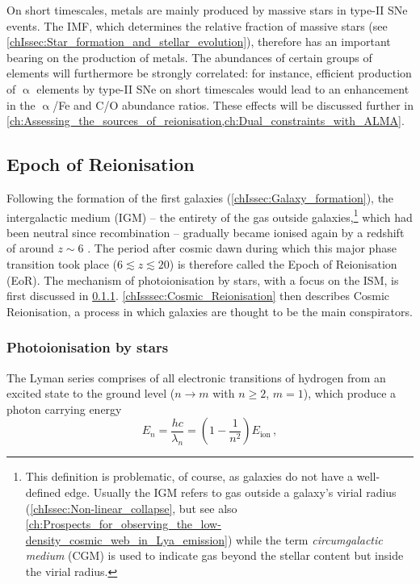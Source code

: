 On short timescales, metals are mainly produced by massive stars in type-II SNe events. The IMF, which determines the relative fraction of massive stars (see \cref{chIssec:Star_formation_and_stellar_evolution}), therefore has an important bearing on the production of metals. The abundances of certain groups of elements will furthermore be strongly correlated: for instance, efficient production of $\upalpha$ elements by type-II SNe on short timescales would lead to an enhancement in the $\upalpha$/Fe and C/O abundance ratios. These effects will be discussed further in \cref{ch:Assessing_the_sources_of_reionisation,ch:Dual_constraints_with_ALMA}.

\subsection{Epoch of Reionisation}
\label{chIssec:Epoch_of_Reionisation}

Following the formation of the first galaxies (\cref{chIssec:Galaxy_formation}), the intergalactic medium (IGM) -- the entirety of the gas outside galaxies,\footnote{This definition is problematic, of course, as galaxies do not have a well-defined edge. Usually the IGM refers to gas outside a galaxy's virial radius (\cref{chIssec:Non-linear_collapse}, but see also \cref{ch:Prospects_for_observing_the_low-density_cosmic_web_in_Lya_emission}) while the term \textit{circumgalactic medium} (CGM) is used to indicate gas beyond the stellar content but inside the virial radius.} which had been neutral since recombination -- gradually became ionised again by a redshift of around $z \sim 6$ \citep{2021arXiv211013160R}. The period after cosmic dawn during which this major phase transition took place ($6 \lesssim z \lesssim 20$) is therefore called the Epoch of Reionisation (EoR). The mechanism of photoionisation by stars, with a focus on the ISM, is first discussed in \cref{chIsssec:Photoionisation_by_stars}. \cref{chIsssec:Cosmic_Reionisation} then describes Cosmic Reionisation, a process in which galaxies are thought to be the main conspirators.

\subsubsection{Photoionisation by stars}
\label{chIsssec:Photoionisation_by_stars}

The Lyman series comprises of all electronic transitions of hydrogen from an excited state to the ground level ($n \rightarrow m$ with $n \geq 2$, $m = 1$), which produce a photon carrying energy
\begin{equation}
    \label{chIeq:Lyman_series_energies}
    E_n = \frac{hc}{\lambda_n} = \left( 1 - \frac{1}{n^2} \right) E_\text{ion} \, ,
\end{equation}

